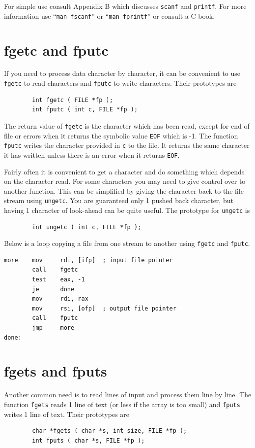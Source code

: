 \documentclass[11pt,b5paper]{book}
\begin{document}
For simple use consult Appendix B which discusses {\tt scanf} and {\tt printf}.
For more information use ``{\tt man fscanf}'' or ``{\tt man fprintf}'' or consult a C book.

\section{fgetc and fputc}

If you need to process data character by character, it can be convenient to use {\tt fgetc}
to read characters and {\tt fputc} to write characters.
Their prototypes are 
\begin{verbatim}
        int fgetc ( FILE *fp );
        int fputc ( int c, FILE *fp );
\end{verbatim}

The return value of {\tt fgetc} is the character which has been read, except for end of file or errors
when it returns the symbolic value {\tt EOF} which is -1.
The function {\tt fputc} writes the character provided in {\tt c} to the file.
It returns the same character it has written unless there is an error when it returns {\tt EOF}.

Fairly often it is convenient to get a character and do something which depends on the character read.
For some characters you may need to give control over to another function.
This can be simplified by giving the character back to the file stream using {\tt ungetc}.
You are guaranteed only 1 pushed back character, but having 1 character of look-ahead can be quite
useful.
The prototype for {\tt ungetc} is
\begin{verbatim}
        int ungetc ( int c, FILE *fp );
\end{verbatim}

Below is a loop copying a file from one stream to another using {\tt fgetc} and {\tt fputc}.
\begin{verbatim}
more    mov     rdi, [ifp]  ; input file pointer
        call    fgetc
        test    eax, -1
        je      done
        mov     rdi, rax
        mov     rsi, [ofp]  ; output file pointer
        call    fputc
        jmp     more
done:
\end{verbatim}

\section{fgets and fputs}

Another common need is to read lines of input and process them line by line.
The function {\tt fgets} reads 1 line of text (or less if the array is too small) and
{\tt fputs} writes 1 line of text.
Their prototypes are
\begin{verbatim}
        char *fgets ( char *s, int size, FILE *fp );
        int fputs ( char *s, FILE *fp );
\end{verbatim}
\end{document}
